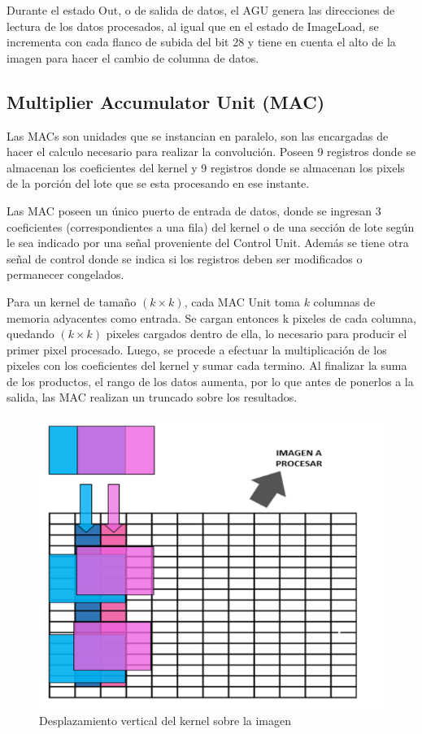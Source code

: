 Durante el estado Out, o de salida de datos, el AGU genera las direcciones de
lectura de los datos procesados, al igual que en el estado de ImageLoad, se
incrementa con cada flanco de subida del bit 28 y tiene en cuenta el alto de la
imagen para hacer el cambio de columna de datos.

\subsection{Multiplier Accumulator Unit (MAC)}\label{sec:MAC}

Las MACs son unidades que se instancian en paralelo, son las encargadas de
hacer el calculo necesario para realizar la convolución. Poseen 9 registros
donde se almacenan los coeficientes del kernel y 9 registros donde se almacenan
los pixels de la porción del lote que se esta procesando en ese instante.

Las MAC poseen un único puerto de entrada de datos, donde se ingresan 3
coeficientes (correspondientes a una fila) del kernel o de una sección de lote
según le sea indicado por una señal proveniente del Control Unit. Además se
tiene otra señal de control donde se indica si los registros deben ser
modificados o permanecer congelados.

Para un kernel de tamaño $(k \times k)$, cada MAC Unit toma $k$ columnas de memoria
adyacentes como entrada. Se cargan entonces k pixeles de cada columna, quedando
$(k \times k)$ pixeles cargados dentro de ella, lo necesario para producir el
primer pixel procesado. Luego, se procede a efectuar la multiplicación de los
pixeles con los coeficientes del kernel y sumar cada termino. Al finalizar la
suma de los productos, el rango de los datos aumenta, por lo que antes de
ponerlos a la salida, las MAC realizan un truncado sobre los resultados.

\begin{figure}
\centering
\includegraphics[scale=0.7]{conv1_despl.png}
\caption{Desplazamiento vertical del kernel sobre la imagen }
\label{verticaldesp}
\end{figure}

